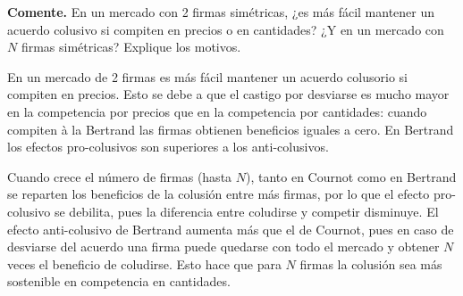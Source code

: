 \question \textbf{Comente.} En un mercado con 2 firmas simétricas, ¿es más fácil mantener un acuerdo colusivo si compiten en precios o en cantidades? ¿Y en un mercado con $N$ firmas simétricas? Explique los motivos.
\begin{solution}
En un mercado de 2 firmas es más fácil mantener un acuerdo colusorio si compiten en precios. Esto se debe a que el castigo por desviarse es mucho mayor en la competencia por precios que en la competencia por cantidades: cuando compiten à la Bertrand las firmas obtienen beneficios iguales a cero. En Bertrand los efectos pro-colusivos son superiores a los anti-colusivos.

Cuando crece el número de firmas (hasta $N$), tanto en Cournot como en Bertrand se reparten los beneficios de la colusión entre más firmas, por lo que el efecto pro-colusivo se debilita, pues la diferencia entre coludirse y competir disminuye. El efecto anti-colusivo de Bertrand aumenta más que el de Cournot, pues en caso de desviarse del acuerdo una firma puede quedarse con todo el mercado y obtener $N$ veces el beneficio de coludirse. Esto hace que para $N$ firmas la colusión sea más sostenible en competencia en cantidades.

\end{solution}

